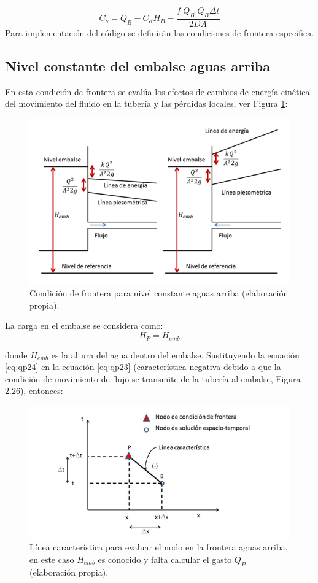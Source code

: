 \documentclass[letterpaper]{report}
\begin{document}
\begin{equation}
	C_\gamma=Q_B-C_\alpha H_B-\dfrac{f|Q_B|Q_B \Delta t}{2DA}
\end{equation}
Para implementación del código se definirán las condiciones de frontera específica.

\subsection{Nivel constante del embalse aguas arriba}
En esta condición de frontera se evalúa los efectos de cambios de energía cinética del movimiento del fluido en la tubería y las pérdidas locales, ver Figura \ref{fig:fig25}:
\clearpage
\begin{figure}[H]
	\centering
	\includegraphics[width=0.9\linewidth]{figuras/fig25}
	\caption{Condición de frontera para nivel constante aguas arriba (elaboración propia).}
	\label{fig:fig25}
\end{figure}

La carga en el embalse se considera como:
\begin{equation}
	H_P=H_{emb}
\label{eq:qp24}
\end{equation}

donde $H_{emb}$ es la altura del agua dentro del embalse. Sustituyendo la ecuación \ref{eq:qp24} en la ecuación \ref{eq:qp23} (característica negativa debido a que la condición de movimiento de flujo se transmite de la tubería al embalse, Figura 2.26), entonces:
\begin{figure}[h]
	\centering
	\includegraphics[width=1.0\linewidth]{figuras/fig26}
	\caption{Línea característica para evaluar el nodo en la frontera aguas arriba, en este caso $H_{emb}$ es conocido y falta calcular el gasto $Q_P$ (elaboración propia).}
	\label{fig:fig26}
\end{figure}
\end{document}
